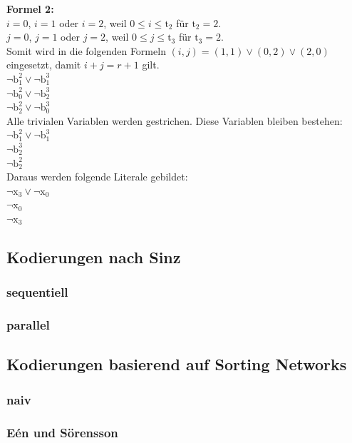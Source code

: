 \documentclass[a4,abstract=on]{scrartcl}
\begin{document}
\textbf{Formel 2:}\\
$i=0$, $i=1$ oder $i=2$, weil $0\leq i \leq \text{t}_2$ für $\text{t}_2 = 2$.\\
$j=0$, $j=1$ oder $j=2$, weil $0\leq j \leq \text{t}_3$ für $\text{t}_3=2$.\\
Somit wird in die folgenden Formeln $(i,j) = (1,1) \vee (0,2) \vee (2,0)$ eingesetzt, damit $i+j = r+1$ gilt.\\
$\neg \text{b}_1^2 \vee \neg \text{b}_1^3$\\
$\neg \text{b}_0^2 \vee \neg \text{b}_2^3$\\
$\neg \text{b}_2^2 \vee \neg \text{b}_0^3$\\

Alle trivialen Variablen werden gestrichen. Diese Variablen bleiben bestehen:\\
$\neg \text{b}_1^2 \vee \neg \text{b}_1^3$\\
$\neg \text{b}_2^3$\\
$\neg \text{b}_2^2$ \\

Daraus werden folgende Literale gebildet:\\
$\neg \text{x}_3 \vee \neg \text{x}_0$\\
$\neg \text{x}_0$\\
$\neg \text{x}_3$\\

		

	\subsection{Kodierungen nach Sinz}
		\subsubsection{sequentiell}
		\subsubsection{parallel}

	\subsection{Kodierungen basierend auf Sorting Networks}
		\subsubsection{naiv}
		\subsubsection{Eén und Sörensson}
\end{document}
